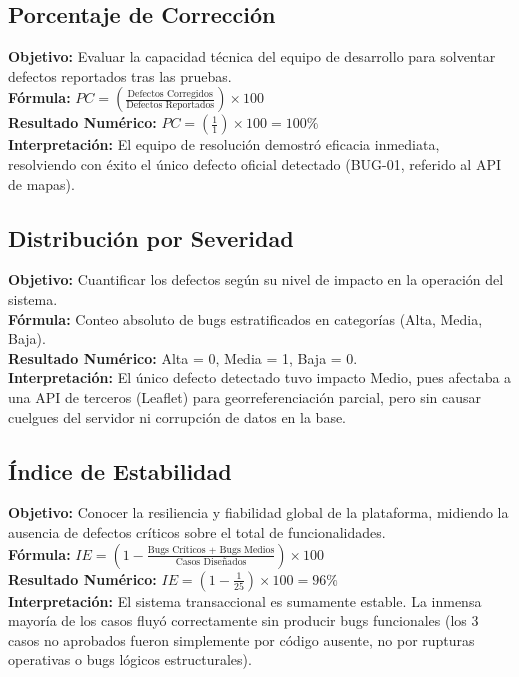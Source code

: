 \subsection{Porcentaje de Corrección}
\textbf{Objetivo:} Evaluar la capacidad técnica del equipo de desarrollo para solventar defectos reportados tras las pruebas. \\
\textbf{Fórmula:} $PC = \left( \frac{\text{Defectos Corregidos}}{\text{Defectos Reportados}} \right) \times 100$ \\
\textbf{Resultado Numérico:} $PC = \left( \frac{1}{1} \right) \times 100 = 100\%$ \\
\textbf{Interpretación:} El equipo de resolución demostró eficacia inmediata, resolviendo con éxito el único defecto oficial detectado (BUG-01, referido al API de mapas).

\subsection{Distribución por Severidad}
\textbf{Objetivo:} Cuantificar los defectos según su nivel de impacto en la operación del sistema. \\
\textbf{Fórmula:} Conteo absoluto de bugs estratificados en categorías (Alta, Media, Baja). \\
\textbf{Resultado Numérico:} Alta = 0, Media = 1, Baja = 0. \\
\textbf{Interpretación:} El único defecto detectado tuvo impacto Medio, pues afectaba a una API de terceros (Leaflet) para georreferenciación parcial, pero sin causar cuelgues del servidor ni corrupción de datos en la base.

\subsection{Índice de Estabilidad}
\textbf{Objetivo:} Conocer la resiliencia y fiabilidad global de la plataforma, midiendo la ausencia de defectos críticos sobre el total de funcionalidades. \\
\textbf{Fórmula:} $IE = \left( 1 - \frac{\text{Bugs Críticos + Bugs Medios}}{\text{Casos Diseñados}} \right) \times 100$ \\
\textbf{Resultado Numérico:} $IE = \left( 1 - \frac{1}{25} \right) \times 100 = 96\%$ \\
\textbf{Interpretación:} El sistema transaccional es sumamente estable. La inmensa mayoría de los casos fluyó correctamente sin producir bugs funcionales (los 3 casos no aprobados fueron simplemente por código ausente, no por rupturas operativas o bugs lógicos estructurales).
